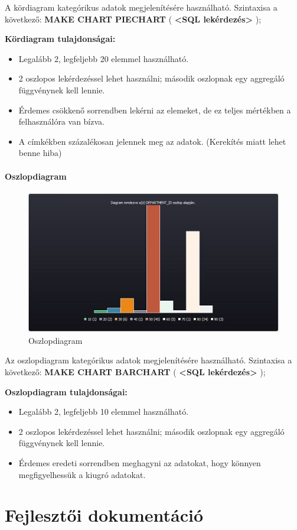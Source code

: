 \documentclass{elteikthesis}
\begin{document}
A kördiagram kategórikus adatok megjelenítésére használható.
Szintaxisa a következő:
\textbf{{\color{awesomeblue} MAKE CHART PIECHART }} ( \textbf{<SQL lekérdezés>} );

\textbf{Kördiagram tulajdonságai:}
\begin{itemize}
  \item Legalább 2, legfeljebb 20 elemmel használható.
  \item 2 oszlopos lekérdezéssel lehet használni; második oszlopnak egy aggregáló függvénynek kell lennie.
  \item Érdemes csökkenő sorrendben lekérni az elemeket, de ez teljes mértékben a felhasználóra van bízva.
  \item A címkékben százalékosan jelennek meg az adatok. (Kerekítés miatt lehet benne hiba)
\end{itemize}

\subsubsection{Oszlopdiagram}
\begin{figure}[ht]
  \begin{center}
    \includegraphics[scale=0.9]{barchart}
  \end{center}
 \caption{Oszlopdiagram}
\end{figure}

Az oszlopdiagram kategórikus adatok megjelenítésére használható.
Szintaxisa a következő:
\textbf{{\color{awesomeblue} MAKE CHART BARCHART }} ( \textbf{<SQL lekérdezés>} );

\textbf{Oszlopdiagram tulajdonságai:}
\begin{itemize}
  \item Legalább 2, legfeljebb 10 elemmel használható.
  \item 2 oszlopos lekérdezéssel lehet használni; második oszlopnak egy aggregáló függvénynek kell lennie.
  \item Érdemes eredeti sorrendben meghagyni az adatokat, hogy könnyen megfigyelhessük a kiugró adatokat.
\end{itemize}

\chapter{Fejlesztői dokumentáció}
\end{document}
